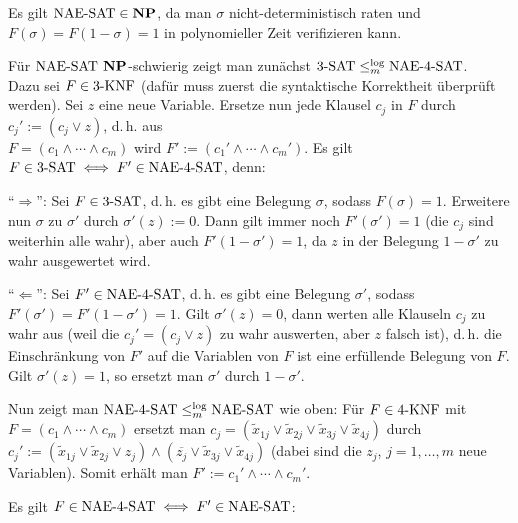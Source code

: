 \begin{Beweis}
    Es gilt $\text{NAE-SAT} \in \mathbf{NP}$, da man $\sigma$ nicht-deterministisch raten und\\
    $F(\sigma) = F(1 - \sigma) = 1$ in polynomieller Zeit verifizieren kann.

    Für $\text{NAE-SAT}$ $\mathbf{NP}$-schwierig zeigt man zunächst
    $3\text{-SAT} \le_m^{\log} \text{NAE-}4\text{-SAT}$.\\
    Dazu sei $F \in 3\text{-KNF}$ (dafür muss zuerst die syntaktische Korrektheit überprüft werden).
    Sei $z$ eine neue Variable.
    Ersetze nun jede Klausel $c_j$ in $F$ durch $c_j' := (c_j \lor z)$, d.\,h. aus\\
    $F = (c_1 \land \dotsb \land c_m)$ wird $F' := (c_1' \land \dotsb \land c_m')$.
    Es gilt $F \in 3\text{-SAT} \iff F' \in \text{NAE-}4\text{-SAT}$, denn:

    "`$\Rightarrow$"':
    Sei $F \in 3\text{-SAT}$,
    d.\,h. es gibt eine Belegung $\sigma$, sodass $F(\sigma) = 1$.
    Erweitere nun $\sigma$ zu $\sigma'$ durch $\sigma'(z) := 0$.
    Dann gilt immer noch $F'(\sigma') = 1$ (die $c_j$ sind weiterhin alle wahr),
    aber auch $F'(1 - \sigma') = 1$, da $z$ in der Belegung $1 - \sigma'$ zu wahr ausgewertet wird.

    "`$\Leftarrow$"':
    Sei $F' \in \text{NAE-}4\text{-SAT}$,
    d.\,h. es gibt eine Belegung $\sigma'$, sodass $F'(\sigma') = F'(1 - \sigma') = 1$.
    Gilt $\sigma'(z) = 0$, dann werten alle Klauseln $c_j$ zu wahr aus
    (weil die $c_j' = (c_j \lor z)$ zu wahr auswerten, aber $z$ falsch ist),
    d.\,h. die Einschränkung von $F'$ auf die Variablen von $F$ ist eine erfüllende Belegung
    von $F$.
    Gilt $\sigma'(z) = 1$, so ersetzt man $\sigma'$ durch $1 - \sigma'$.

    Nun zeigt man $\text{NAE-}4\text{-SAT} \le_m^{\log} \text{NAE-SAT}$ wie oben:
    Für $F \in 4\text{-KNF}$ mit $F = (c_1 \land \dotsb \land c_m)$ ersetzt man
    $c_j = (\widetilde{x}_{1j} \lor \widetilde{x}_{2j} \lor
    \widetilde{x}_{3j} \lor \widetilde{x}_{4j})$ durch
    $c_j' := (\widetilde{x}_{1j} \lor \widetilde{x}_{2j} \lor z_j) \land
    (\overline{z_j} \lor \widetilde{x}_{3j} \lor \widetilde{x}_{4j})$
    (dabei sind die $z_j$, $j = 1, \dotsc, m$ neue Variablen).
    Somit erhält man $F' := c_1' \land \dotsb \land c_m'$.

    Es gilt $F \in \text{NAE-}4\text{-SAT} \iff F' \in \text{NAE-SAT}$:


\end{Beweis}
